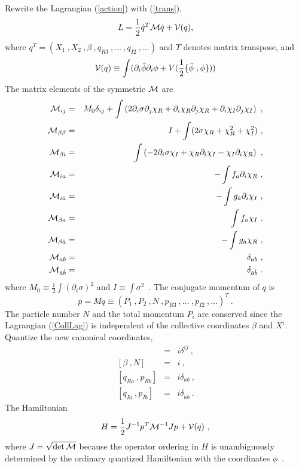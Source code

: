 \documentclass[a4paper,a4paper]{article}
\def\da{{\dot{a}}}
\def\db{{\dot{b}}}
\begin{document}
Rewrite the Lagrangian (\ref{action}) with (\ref{trans}),
\begin{equation}
  L=\frac 12 \dot{q}^T{\cal M}\dot{q}+{\cal V}(q),                                                      \label{CollLag}
\end{equation}
where $q^T=(X_1\ ,X_2\ ,\beta\ ,q_{R3}\ ,\ldots\ ,q_{I2}\ ,\ldots)$ and $T$ denotes 
matrix transpose, and 
\begin{equation}
  {\cal V}(q)\equiv\int(\partial_i\bar{\phi}\partial_i\phi+V(\frac 12\{\bar{\phi}\ ,\phi\}))            \label{CalPot}
\end{equation}                                                                                         
The matrix
elements of the symmetric ${\cal M}$ are
\begin{eqnarray}
{\cal M}_{ij}&=&M_0\delta_{ij}+\int\left(2\partial_i\sigma\partial_j\chi_R+\partial_i\chi_R
\partial_j\chi_R+\partial_i\chi_I\partial_j\chi_I\right)\ ,\\ 
{\cal M}_{\beta\beta}&=&I+\int(2\sigma\chi_R+\chi_R^2+\chi_I^2)\ ,\\ 
{\cal M}_{\beta i}&=&\int\left(-2\partial_i\sigma\chi_I+\chi_R\partial_i\chi_I-\chi_I\partial_i\chi_R\right)\
,\\ 
{\cal M}_{ia}&=&-\int f_a\partial_i\chi_R\ ,\\
{\cal M}_{i\da}&=&-\int g_{\da} \partial_i\chi_I\ ,\\
{\cal M}_{\beta a}&=&\int f_a\chi_I\ ,\\
{\cal M}_{\beta \da}&=&-\int g_{\da}\chi_R\ ,\\ 
{\cal M}_{ab}&=&\delta_{ab}\ ,\\
{\cal M}_{\da\db}&=&\delta_{{\da}{\db}}\ .
\end{eqnarray}
where $M_0\equiv\frac 12\int(\partial_i\sigma)^2$ and
$I\equiv\int\sigma^2$\ .
The conjugate momentum of $q$ is
\begin{equation}
  p=M\dot{q}\equiv(P_1\ ,P_2\ ,N\ ,p_{R3}\ ,\ldots\ ,p_{I2}\ ,\ldots)^T\ .
\end{equation}
The particle number $N$ and the total momentum $P_i$ are conserved 
since the Lagrangian (\ref{CollLag}) is independent of the collective coordinates 
$\beta$ and $X^i$. 
Quantize the new canonical coordinates, 
\begin{eqnarray}
  [X^i\ ,P^j]&=&i\delta^{ij}\ ,\\
  ~[\beta\ ,N]&=&i\ ,\\
  ~[q_{Ra}\ ,p_{Rb}]&=&i\delta_{ab}\ ,\\
  ~[q_{I\da}\ ,p_{I\db}]&=&i\delta_{\da\db}\ .
\end{eqnarray}
The Hamiltonian 
\begin{equation}
  H=\frac 12J^{-1}p^T{\cal M}^{-1}Jp+{\cal V}(q)\ ,
\end{equation} 
where $J=\sqrt{\det {\cal M}}$ because the operator ordering in $H$ is unambiguously 
determined by the 
ordinary quantized Hamiltonian with the coordinates $\phi$~\cite{ChristLee}. 
\end{document}
